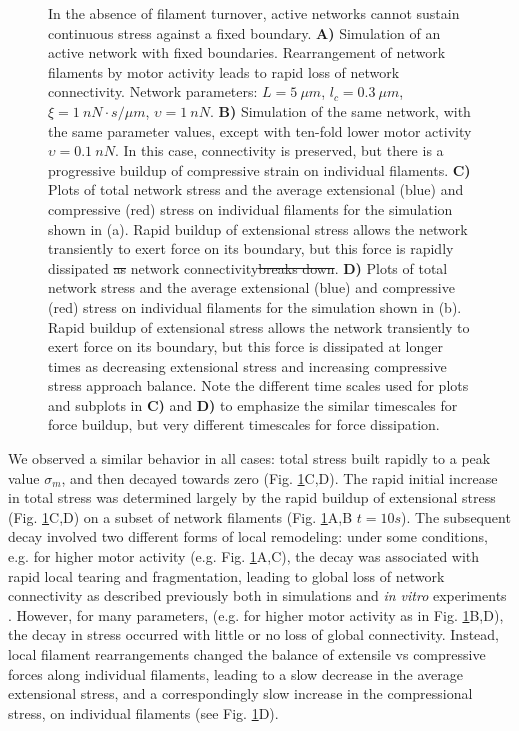 \documentclass[10pt,letterpaper]{article}
\providecommand{\DIFaddtex}[1]{{\protect\color{blue}\uwave{#1}}} %
\providecommand{\DIFdeltex}[1]{{\protect\color{red}\sout{#1}}}                      %
\providecommand{\DIFaddFL}[1]{\DIFadd{#1}} %
\providecommand{\DIFdelFL}[1]{\DIFdel{#1}} %
\providecommand{\DIFaddbeginFL}{} %
\providecommand{\DIFaddendFL}{} %
\providecommand{\DIFdelbeginFL}{} %
\providecommand{\DIFdelendFL}{} %
\providecommand{\DIFadd}[1]{\texorpdfstring{\DIFaddtex{#1}}{#1}} %
\providecommand{\DIFdel}[1]{\texorpdfstring{\DIFdeltex{#1}}{}} %
\begin{document}
\begin{figure}[h!]
	\centering
	\caption{\label{fig:active_str} In the absence of filament turnover, active networks cannot sustain continuous stress against a fixed boundary.  \textbf{A)} Simulation of an active network with fixed boundaries. Rearrangement of network filaments by motor activity leads to rapid loss of network connectivity.  Network parameters: $L=5\: \mu m$, $l_c=0.3\: \mu m$, $\xi=1\: nN\cdot s/\mu m$, $\upsilon=1\: nN$.  \textbf{B)} Simulation of the same network, with the same parameter values, except with ten-fold lower motor activity $\upsilon=0.1\: nN$. In this case, connectivity is preserved, but there is a progressive buildup of compressive strain on individual filaments.  \textbf{C)} Plots of total network stress and the average extensional (blue) and compressive (red) stress on individual filaments for the simulation shown in (a). Rapid buildup of extensional stress allows the network transiently to exert force on its boundary, but this force is rapidly dissipated \DIFdelbeginFL \DIFdelFL{as }\DIFdelendFL \DIFaddbeginFL \DIFaddFL{and this dissipation is associated with a breakdown in }\DIFaddendFL network connectivity\DIFdelbeginFL \DIFdelFL{breaks down}\DIFdelendFL .  \textbf{D)} Plots of total network stress and the average extensional (blue) and compressive (red) stress on individual filaments for the simulation shown in (b). Rapid buildup of extensional stress allows the network transiently to exert force on its boundary, but this force is dissipated at longer times as decreasing extensional stress and increasing compressive stress approach balance.  Note the different time scales used for plots and subplots in \textbf{C)} and \textbf{D)} to emphasize the similar timescales for force buildup, but very different timescales for force dissipation.}
\end{figure}

We observed a similar behavior in all cases: total stress built rapidly to a peak value $\sigma_m$, and then decayed towards zero (Fig. \ref{fig:active_str}C,D).  The rapid initial increase in total stress was determined largely by the rapid buildup of extensional stress (Fig. \ref{fig:active_str}C,D) on a subset of network filaments (Fig. \ref{fig:active_str}A,B $t=10s$). The subsequent decay involved two different forms of local remodeling: under some conditions, e.g. for higher motor activity (e.g. Fig. \ref{fig:active_str}A,C), the decay was associated with rapid local tearing and fragmentation, leading to global loss of network connectivity as described previously both in simulations\cite{Mak:2016aa} and {\em in vitro}  experiments \cite{Alvarado:2013aa}.  However, for many parameters, (e.g. for higher motor activity  as in Fig. \ref{fig:active_str}B,D), the decay in stress occurred with little or no loss of global connectivity.  Instead, local filament rearrangements changed the balance of extensile vs compressive forces along individual filaments, leading to a slow decrease in the average extensional stress, and a correspondingly slow increase in the compressional stress, on individual filaments (see Fig. \ref{fig:active_str}D).  
\end{document}

